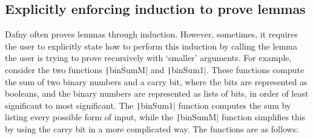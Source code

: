 \subsection{Explicitly enforcing induction to prove lemmas}\label{sec:induction}

Dafny often proves lemmas through induction. However, sometimes, it requires the user to explicitly state how to perform this induction by calling the lemma the user is trying to prove recursively with `smaller' arguments. For example, consider the two functions \texttt|binSumM| and \texttt|binSum1|. These functions compute the sum of two binary numbers and a carry bit, where the bits are represented as booleans, and the binary numbers are represented as lists of bits, in order of least significant to most significant. The \texttt|binSum1| function computes the sum by listing every possible form of input, while the \texttt|binSumM| function simplifies this by using the carry bit in a more complicated way. The functions are as follows: 

